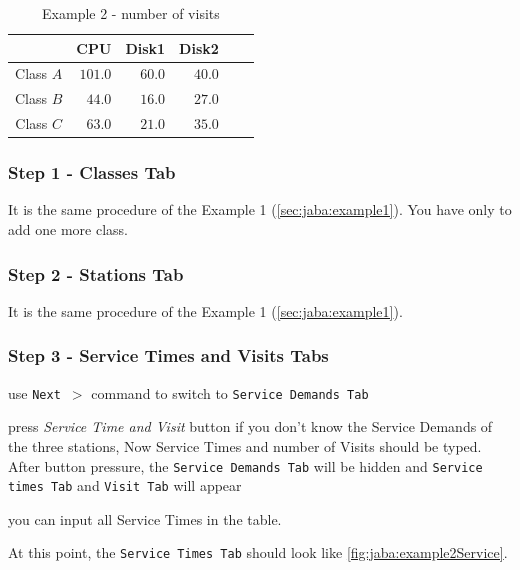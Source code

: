 \begin{table}[htbp]
\begin{center}
\begin{tabular}{c|r|r|r|r|r|}
& \multicolumn{1}{c|}{CPU} & \multicolumn{1}{c|}{Disk1} & \multicolumn{1}{c|}{Disk2} \\
\hline
Class $A$ & $101.0$ & $60.0$ & $40.0$ \\
Class $B$ & $44.0$ & $16.0$ & $27.0$ \\
Class $C$ & $63.0$ & $21.0$ & $35.0$ \\
\hline
\end{tabular}
\end{center}
\caption{Example 2 - number of visits}
\label{tab:jmva:example2Visits}
\end{table}


\subsubsection{Step 1 - Classes Tab}
It is the same procedure of the Example 1 (\autoref{sec:jaba:example1}). You have only to add one more class.
\subsubsection{Step 2 - Stations Tab}
It is the same procedure of the Example 1 (\autoref{sec:jaba:example1}).
\subsubsection{Step 3 - Service Times and Visits Tabs}
\begin{itemize*}
\item use \texttt{Next $>$} command to switch to \texttt{Service Demands Tab}
\item press \emph{Service Time and Visit} button if you don't know
the Service Demands of the three stations, Now Service
Times and number of Visits should be typed. After button pressure,
the \texttt{Service Demands Tab} will be hidden and \texttt{Service
times Tab} and \texttt{Visit Tab} will appear
\item you can input all Service Times in the table.
\end{itemize*}

At this point, the \texttt{Service Times Tab} should look like
\autoref{fig:jaba:example2Service}.

